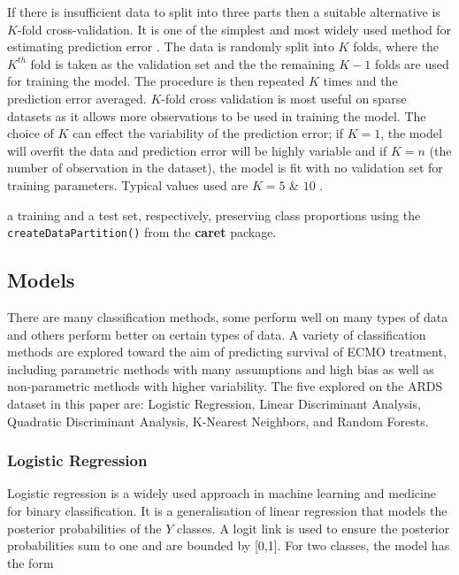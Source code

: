 \documentclass[12pt,]{article}
\begin{document}
If there is insufficient data to split into three parts then a suitable
alternative is \(K\)-fold cross-validation. It is one of the simplest
and most widely used method for estimating prediction error
\citep{hastie_elements_2009}. The data is randomly split into \(K\)
folds, where the \(K^{th}\) fold is taken as the validation set and the
the remaining \(K-1\) folds are used for training the model. The
procedure is then repeated \(K\) times and the prediction error
averaged. \(K\)-fold cross validation is most useful on sparse datasets
as it allows more observations to be used in training the model. The
choice of \(K\) can effect the variability of the prediction error; if
\(K=1\), the model will overfit the data and prediction error will be
highly variable and if \(K=n\) (the number of observation in the
dataset), the model is fit with no validation set for training
parameters. Typical values used are \(K=5\) \& \(10\)
\citep{hastie_elements_2009}.

a training and a test set, respectively, preserving class proportions
using the \texttt{createDataPartition()} from the \textbf{caret}
package.

\subsection{Models}\label{models}

There are many classification methods, some perform well on many types
of data and others perform better on certain types of data. A variety of
classification methods are explored toward the aim of predicting
survival of ECMO treatment, including parametric methods with many
assumptions and high bias as well as non-parametric methods with higher
variability. The five explored on the ARDS dataset in this paper are:
Logistic Regression, Linear Discriminant Analysis, Quadratic
Discriminant Analysis, K-Nearest Neighbors, and Random Forests.

\subsubsection{Logistic Regression}\label{logistic-regression}

Logistic regression is a widely used approach in machine learning and
medicine for binary classification. It is a generalisation of linear
regression that models the posterior probabilities of the \(Y\) classes.
A logit link is used to ensure the posterior probabilities sum to one
and are bounded by {[}0,1{]}. For two classes, the model has the form
\end{document}
